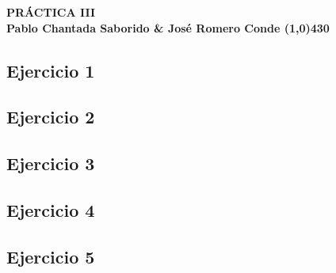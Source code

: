 \documentclass{article}
\begin{document}
\begin{center}
    \LARGE\bfseries PRÁCTICA III\\
    \small Pablo Chantada Saborido \& José Romero Conde
    \line(1,0){430}
\end{center}


\subsection*{Ejercicio 1}
\subsection*{Ejercicio 2}
\subsection*{Ejercicio 3}
\subsection*{Ejercicio 4}
\subsection*{Ejercicio 5}
\end{document}
